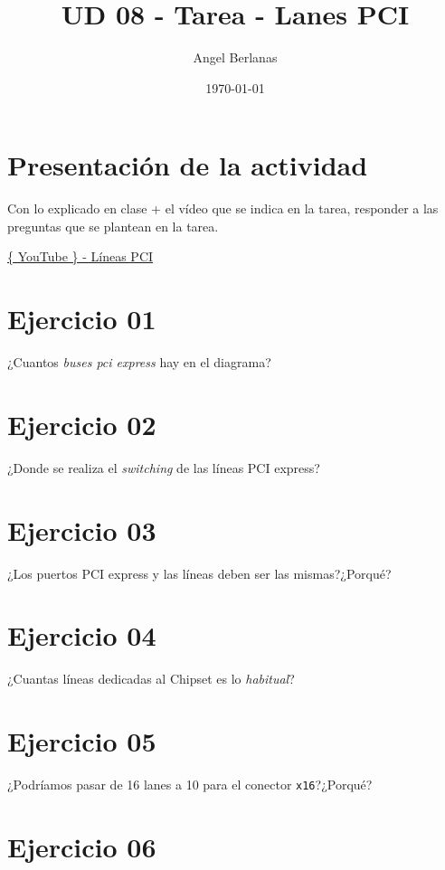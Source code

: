 \documentclass[11pt]{article}
\author{Angel Berlanas}
\date{\today}
\title{UD 08 - Tarea - Lanes PCI}
\begin{document}
\maketitle
\tableofcontents


\section{Presentación de la actividad}
\label{sec:org96d7d58}

Con lo explicado en clase + el vídeo que se indica en la tarea, responder a
las preguntas que se plantean en la tarea.

\href{https://www.youtube.com/watch?v=J4eSCMtaRuQ}{\{ YouTube \} - Líneas PCI}

\section{Ejercicio 01}
\label{sec:orgff5d226}

¿Cuantos \emph{buses pci express} hay en el diagrama?

\section{Ejercicio 02}
\label{sec:orgcbfe08c}

¿Donde se realiza el \emph{switching} de las líneas PCI express?

\section{Ejercicio 03}
\label{sec:org1ee9891}

¿Los puertos PCI express y las líneas deben ser las mismas?¿Porqué?

\section{Ejercicio 04}
\label{sec:org4b8b4ff}

¿Cuantas líneas dedicadas al Chipset es lo \emph{habitual}?

\section{Ejercicio 05}
\label{sec:org3304fdf}

¿Podríamos pasar de 16 lanes a 10 para el conector \texttt{x16}?¿Porqué?

\section{Ejercicio 06}
\label{sec:orged6fe37}
\end{document}
